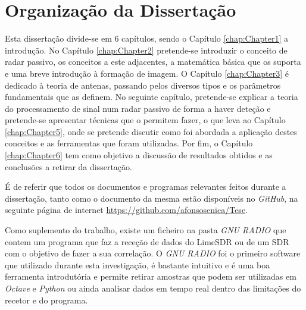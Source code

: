 \section{Organização da Dissertação}
Esta dissertação divide-se em 6 capítulos, sendo o Capítulo \ref{chap:Chapter1} a introdução. No Capítulo \ref{chap:Chapter2} pretende-se introduzir o conceito de radar passivo, os conceitos a este adjacentes, a matemática básica que os suporta e uma breve introdução à formação de imagem. O Capítulo \ref{chap:Chapter3} é dedicado à teoria de antenas, passando pelos diversos tipos e os parâmetros fundamentais que as definem. No seguinte capítulo, pretende-se explicar a teoria do processamento de sinal num radar passivo de forma a haver deteção e pretende-se apresentar técnicas que o permitem fazer, o que leva ao Capítulo \ref{chap:Chapter5}, onde se pretende discutir como foi abordada a aplicação destes conceitos e as ferramentas que foram utilizadas. Por fim, o Capítulo \ref{chap:Chapter6} tem como objetivo a discussão de resultados obtidos e as conclusões a retirar da dissertação.\par 
É de referir que todos os documentos e programas relevantes feitos durante a dissertação, tanto como o documento da mesma estão disponíveis no \textit{GitHub}, na seguinte página de internet \url{https://github.com/afonsosenica/Tese}.\par 
Como suplemento do trabalho, existe um ficheiro na pasta \textit{GNU RADIO} que contem um programa que faz a receção de dados do LimeSDR ou de um \gls{SDR} com o objetivo de fazer a sua correlação. O \textit{GNU RADIO} foi o primeiro software que utilizado durante esta investigação, é bastante intuitivo e é uma boa ferramenta introdutória e permite retirar amostras que podem ser utilizadas em \textit{Octave} e \textit{Python} ou ainda analisar dados em tempo real dentro das limitações do recetor e do programa.